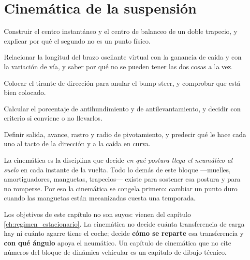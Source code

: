 \chapter{Cinemática de la suspensión}
\label{ch:cinematica_suspension}

\begin{objetivos}
  \item Construir el centro instantáneo y el centro de balanceo de un doble
        trapecio, y explicar por qué el segundo no es un punto físico.
  \item Relacionar la longitud del brazo oscilante virtual con la ganancia de
        caída y con la variación de vía, y saber por qué no se pueden tener las
        dos cosas a la vez.
  \item Colocar el tirante de dirección para anular el bump steer, y comprobar
        que está bien colocado.
  \item Calcular el porcentaje de antihundimiento y de antilevantamiento, y
        decidir con criterio si conviene o no llevarlos.
  \item Definir salida, avance, rastro y radio de pivotamiento, y predecir qué
        le hace cada uno al tacto de la dirección y a la caída en curva.
\end{objetivos}


La cinemática es la disciplina que decide \emph{en qué postura llega el
neumático al suelo} en cada instante de la vuelta. Todo lo demás de este bloque
---muelles, amortiguadores, manguetas, trapecios--- existe para sostener esa
postura y para no romperse. Por eso la cinemática se congela primero: cambiar
un punto duro cuando las manguetas están mecanizadas cuesta una temporada.

\begin{clave}
Los objetivos de este capítulo no son suyos: vienen del capítulo
\ref{ch:regimen_estacionario}. La cinemática no decide cuánta transferencia de
carga hay ni cuánto agarre tiene el coche; decide \textbf{cómo se reparte} esa
transferencia y \textbf{con qué ángulo} apoya el neumático. Un capítulo de
cinemática que no cite números del bloque de dinámica vehicular es un capítulo
de dibujo técnico.
\end{clave}

